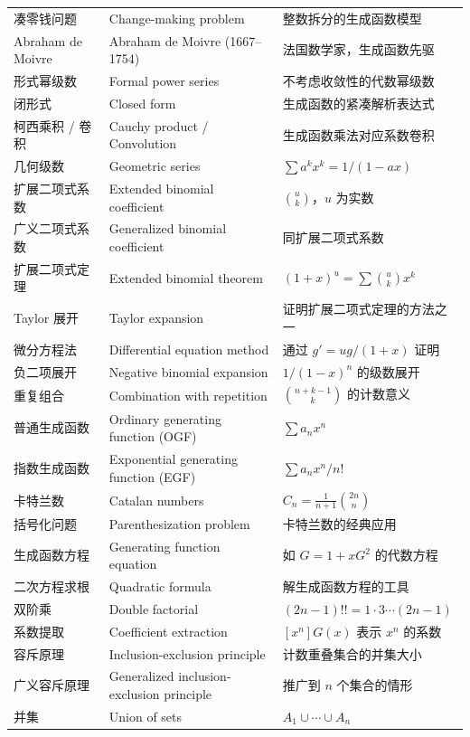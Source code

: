\documentclass[UTF8,11pt,a4paper]{ctexbook}   %
\theoremstyle{definition}
\begin{document}
\begin{longtable}{|p{4.8cm}|p{4.8cm}|p{4.8cm}|}
凑零钱问题 & Change-making problem & 整数拆分的生成函数模型 \\
Abraham de Moivre & Abraham de Moivre (1667--1754) & 法国数学家，生成函数先驱 \\
\hline
形式幂级数 & Formal power series & 不考虑收敛性的代数幂级数 \\
闭形式 & Closed form & 生成函数的紧凑解析表达式 \\
柯西乘积 / 卷积 & Cauchy product / Convolution & 生成函数乘法对应系数卷积 \\
几何级数 & Geometric series & $\sum a^k x^k = 1/(1-ax)$ \\
扩展二项式系数 & Extended binomial coefficient & $\binom{u}{k}$，$u$ 为实数 \\
广义二项式系数 & Generalized binomial coefficient & 同扩展二项式系数 \\
扩展二项式定理 & Extended binomial theorem & $(1+x)^u=\sum\binom{u}{k}x^k$ \\
Taylor 展开 & Taylor expansion & 证明扩展二项式定理的方法之一 \\
微分方程法 & Differential equation method & 通过 $g'=ug/(1+x)$ 证明 \\
负二项展开 & Negative binomial expansion & $1/(1-x)^n$ 的级数展开 \\
重复组合 & Combination with repetition & $\binom{n+k-1}{k}$ 的计数意义 \\
普通生成函数 & Ordinary generating function (OGF) & $\sum a_n x^n$ \\
指数生成函数 & Exponential generating function (EGF) & $\sum a_n x^n/n!$ \\
卡特兰数 & Catalan numbers & $C_n=\frac{1}{n+1}\binom{2n}{n}$ \\
括号化问题 & Parenthesization problem & 卡特兰数的经典应用 \\
生成函数方程 & Generating function equation & 如 $G=1+xG^2$ 的代数方程 \\
二次方程求根 & Quadratic formula & 解生成函数方程的工具 \\
双阶乘 & Double factorial & $(2n-1)!!=1\cdot 3\cdots(2n-1)$ \\
系数提取 & Coefficient extraction & $[x^n]G(x)$ 表示 $x^n$ 的系数 \\
\hline
容斥原理 & Inclusion-exclusion principle & 计数重叠集合的并集大小 \\
广义容斥原理 & Generalized inclusion-exclusion principle & 推广到 $n$ 个集合的情形 \\
并集 & Union of sets & $A_1\cup\cdots\cup A_n$ \\

\end{longtable}
\end{document}
